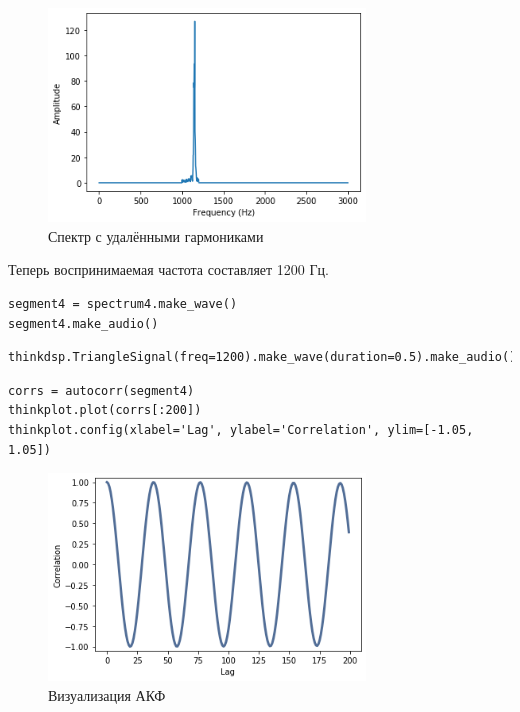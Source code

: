 \documentclass[a4paper,12pt]{report}
\begin{document}
\begin{figure}[H]
        \centering
        \includegraphics[width=0.75\textwidth]{lab5_fig4_6.png}
        \caption{Спектр с удалёнными гармониками}
        \label{fig:lab5_fig4_6}
\end{figure}

Теперь воспринимаемая частота составляет 1200 Гц.

\begin{lstlisting}[caption=Прослушивание нового звука]
segment4 = spectrum4.make_wave()
segment4.make_audio()
\end{lstlisting}

\begin{lstlisting}[caption=Треугольный сигнал на 1200 Гц]
thinkdsp.TriangleSignal(freq=1200).make_wave(duration=0.5).make_audio()
\end{lstlisting}

\begin{lstlisting}[caption=Визуализация АКФ]
corrs = autocorr(segment4)
thinkplot.plot(corrs[:200])
thinkplot.config(xlabel='Lag', ylabel='Correlation', ylim=[-1.05, 1.05])
\end{lstlisting}

\begin{figure}[H]
        \centering
        \includegraphics[width=0.75\textwidth]{lab5_fig4_7.png}
        \caption{Визуализация АКФ}
        \label{fig:lab5_fig4_7}
\end{figure}
\end{document}
